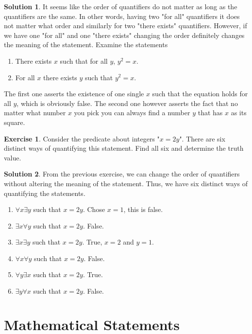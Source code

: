 \documentclass[a4paper, 11pt]{report}
\theoremstyle{plain}
\theoremstyle{definition}
\newtheorem{exrc}[thm]{Exercise}
\newtheorem*{sltn}{Solution}
\begin{document}
\begin{sltn}
It seems like the order of quantifiers do not matter as long as the
quantifiers are the same. In other words, having two "for all" quantifiers it
does not matter what order and similarly for two "there exists" quantifiers.
However, if we have one "for all" and one "there exists" changing the order
definitely changes the meaning of the statement. Examine the statements
\begin{enumerate}
  \item There exists $x$ such that for all $y$, $y^2 = x$.
  \item For all $x$ there exists $y$ such that $y^2 = x$.
\end{enumerate}
The first one asserts the existence of one single $x$ such that the equation
holds for all $y$, which is obviously false. The second one however asserts the
fact that no matter what number $x$ you pick you can always find a number $y$
that has $x$ as its square.
\end{sltn}

\begin{exrc}
  Consider the predicate about integers "$x = 2y$". There are six distinct ways
  of quantifying this statement. Find all six and determine the truth value.
\end{exrc}

\begin{sltn}
From the previous exercise, we can change the order of quantifiers without
altering the meaning of the statement. Thus, we have six distinct ways of
quantifying the statements.

\begin{enumerate}
  \item $\forall x \exists y$ such that $x = 2y$. Chose $x = 1$, this is false.
  \item $\exists x \forall y$ such that $x = 2y$. False.
  \item $\exists x \exists y$ such that $x = 2y$. True, $x = 2$ and $y = 1$.
  \item $\forall x \forall y$ such that $x = 2y$. False.
  \item $\forall y \exists x$ such that $x = 2y$. True.
  \item $\exists y \forall x$ such that $x = 2y$. False.
\end{enumerate}
\end{sltn}

\section{Mathematical Statements}
\label{sec:mathematical_statements}
\end{document}

